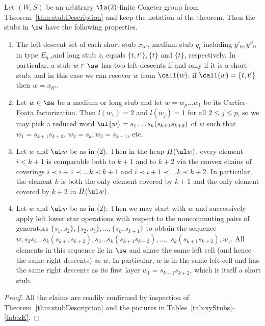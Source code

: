 \begin{lemma}
    \label{lemm:stubRemarks}
    Let $(W,S)$ be an arbitrary $\la(2)$-finite Coxeter group from Theorem~\ref{thm:stubDescription} and keep the notation
    of the theorem.  Then the stubs in $\sw$ have the following properties.  
    \begin{enumerate}
        \item The left descent set of each short stub  $x_{tt'}$, medium stub $y_t$ \tul including
             $y'_0,y''_0$ in type $E_{q,r}$\tur and long stub $z_t$ equals $\{t,t'\}, \{t\}$ and
             $\{t\}$, respectively. In particular, a stub $w\in \sw$ has two left descents if and
             only if it is a short stub, and in this case we can recover $w$ from $\call(w)$: if
             $\call(w)=\{t,t'\}$ then $w=x_{tt'}$.
        \item Let $w\in \sw$ be a medium or long stub and let $w=w_p\dots w_1$ be its Cartier--Foata
             factorization.  Then $l(w_1)=2$ and  $l(w_j)=1$ for all $2\le j\le p$, so we may pick a
             reduced word $ \ul{w}= s_1\dots s_{k}(s_{k+1}s_{k+2}) $ of $w$ such that
             $w_1=s_{k+1}s_{k+2}$, $w_2=s_{k}, w_3=s_{k-1}$, etc.
        \item Let $w$ and $\ul w$ be as in \textup{(2)}. Then in the heap $H(\ul w)$, every element
             $i<k+1$ is comparable both to $k+1$ and to $k+2$ via the convex chains of coverings
             $i\prec i+1\prec \dots k\prec k+1$ and $i\prec i+1\prec \dots k\prec k+2$. In
             particular, the element $k$ is both the only element covered by $k+1$ and the only
             element covered by $k+2$ in $H(\ul w)$. 
        \item Let $w$ and $\ul w$ be as in \textup{(2)}. Then we may start with $w$ and successively
             apply left lower star operations with respect to the noncommuting pairs of generators
             $\{s_1,s_2\}, \{s_2,s_3\},\dots, \{s_{k},s_{k+1}\}$ to obtain the sequence $w,
             s_2s_3\dots s_k(s_{k+1}s_{k+2}), s_3\dots s_{k}(s_{k+1}s_{k+2}), \dots,$
             $s_k(s_{k+1}s_{k+2}), w_1$. All elements in this sequence lie in $\sw$ and share the
             same left cell (and hence the same right descents) as $w$. In particular, $w$ is
             in the same left cell and has the same right descents as its first layer $w_1 =
             s_{k+1}s_{k+2}$, which is itself a short stub.
            \end{enumerate}
    \end{lemma}
    \begin{proof} All the claims are readily confirmed by inspection of Theorem~\ref{thm:stubDescription}
          and the pictures in Tables~\ref{tab:xyStubs}--\ref{tab:zE}.     
    \end{proof}

